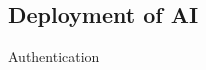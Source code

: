 \documentclass{beamer}
\begin{document}
\subsection{Deployment of AI}
\begin{frame}{Authentication}
\begin{figure}[H]
\end{figure}
\end{frame}
\end{document}
